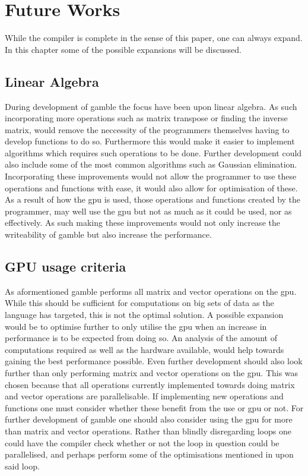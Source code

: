 \chapter{Future Works}\label{cha:future_works}
While the compiler is complete in the sense of this paper, one can always expand.
In this chapter some of the possible expansions will be discussed.

\section{Linear Algebra}\label{improve:LIAL}
During development of \gls{gamble} the focus have been upon linear algebra.
As such incorporating more operations such as matrix transpose or finding the inverse matrix, would remove the neccessity of the programmers themselves having to develop functions to do so.
Furthermore this would make it easier to implement algorithms which requires such operations to be done.
Further development could also include some of the most common algorithms such as Gaussian elimination.
Incorporating these improvements would not allow the programmer to use these operations and functions with ease, it would also allow for optimisation of these.
As a result of how the \acrshort{gpu} is used, those operations and functions created by the programmer, may well use the \acrshort{gpu} but not as much as it could be used, nor as effectively.
As such making these improvements would not only increase the writeability of \gls{gamble} but also increase the performance.

\section{GPU usage criteria}
As aformentioned \gls{gamble} performs all matrix and vector operations on the \acrshort{gpu}.
While this should be sufficient for computations on big sets of data as the language has targeted, this is not the optimal solution.
A possible expansion would be to optimise further to only utilise the \acrshort{gpu} when an increase in performance is to be expected from doing so.
An analysis of the amount of computations required as well as the hardware available, would help towards gaining the best performance possible.
Even further development should also look further than only performing matrix and vector operations on the \acrshort{gpu}.
This was chosen because that all operations currently implemented towards doing matrix and vector operations are parallelisable.
If implementing new operations and functions one must consider whether these benefit from the use or \acrshort{gpu} or not.
For further development of \gls{gamble} one should also consider using the \acrshort{gpu} for more than matrix and vector operations. 
Rather than blindly disregarding loops one could have the compiler check whether or not the loop in question could be parallelised, and perhaps perform some of the optimisations mentioned in  upon said loop.
 



